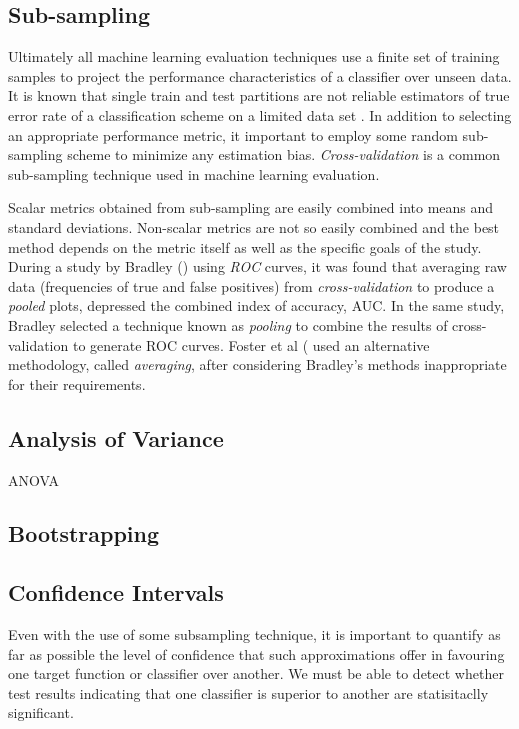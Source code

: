\documentclass[12pt]{unbthesis}
\begin{document}
\subsection{Sub-sampling}
Ultimately all machine learning evaluation techniques use a finite set
of training samples to project the performance characteristics of a
classifier over unseen data. It is known that single train and test
partitions are not reliable estimators of true error rate of a
classification scheme on a limited data set \cite{RefWorks:57}. In
addition to selecting an appropriate performance metric, it important
to employ some random sub-sampling scheme to minimize any estimation
bias. \textit{Cross-validation} is a common sub-sampling technique
used in machine learning evaluation.

Scalar metrics obtained from sub-sampling are easily combined into
means and standard deviations. Non-scalar metrics are not so easily
combined and the best method depends on the metric itself as well as
the specific goals of the study. During a
study by Bradley (\cite{RefWorks:32}) using \textit{ROC} curves, it was found
that averaging raw data (frequencies of true and false positives) from
\textit{cross-validation} to produce a \textit{pooled} plots,
depressed the combined index of accuracy, AUC. In the same study,
Bradley selected a technique known as \textit{pooling} to combine the
results of cross-validation to generate ROC curves. Foster et al
(\cite{RefWorks:45} used an alternative methodology, called
\textit{averaging}, after considering Bradley's methods inappropriate
for their requirements.

\subsection{Analysis of Variance}
ANOVA

\subsection{Bootstrapping}


\subsection{Confidence Intervals}
Even with the use of some subsampling technique, it is important to
quantify as far as possible the level of confidence that such
approximations offer in favouring one target function or classifier
over another.  We must be able to detect whether test results
indicating that one classifier is superior to another are
statisitaclly significant. 
\end{document}
